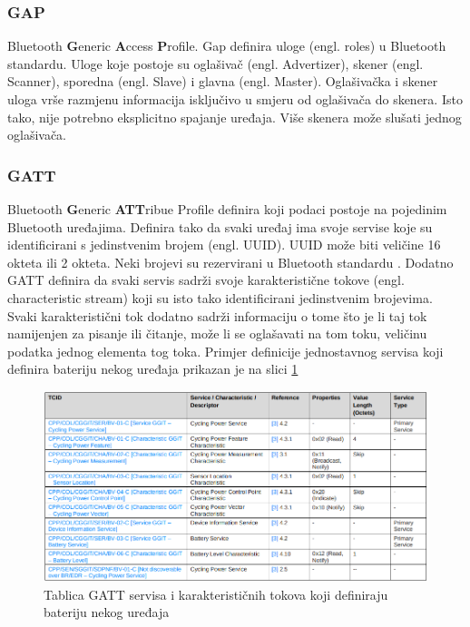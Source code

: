 \documentclass[times, utf8, diplomski]{diplomski}
\begin{document}
\subsubsection{GAP}
Bluetooth \textbf{G}eneric \textbf{A}ccess \textbf{P}rofile.
Gap definira uloge (engl. roles) u Bluetooth standardu. Uloge koje postoje su oglašivač (engl. Advertizer), skener (engl. Scanner), sporedna (engl. Slave) i glavna (engl. Master). Oglašivačka i skener uloga vrše razmjenu informacija isključivo u smjeru od oglašivača do skenera. Isto tako, nije potrebno eksplicitno spajanje uređaja.
Više skenera može slušati jednog oglašivača.

\subsubsection{GATT}
Bluetooth \textbf{G}eneric \textbf{ATT}ribue Profile definira koji podaci postoje na pojedinim Bluetooth uređajima. Definira tako da svaki uređaj ima svoje servise koje su identificirani s jedinstvenim brojem (engl. UUID). UUID može biti veličine 16 okteta ili 2 okteta. Neki brojevi su rezervirani u Bluetooth standardu \cite{core41}.
Dodatno GATT definira da svaki servis sadrži svoje karakteristične tokove (engl. characteristic stream) koji su isto tako identificirani jedinstvenim brojevima. Svaki karakteristični tok dodatno sadrži informaciju o tome što je li taj tok namijenjen za pisanje ili čitanje, može li se oglašavati na tom toku, veličinu podatka jednog elementa tog toka. Primjer definicije jednostavnog servisa koji definira bateriju nekog uređaja prikazan je na slici \ref{fig:gattexample}

\begin{figure}[H]
\includegraphics[width=\textwidth]{examplegatt_20230623_212042.png}
\centering
\caption{Tablica GATT servisa i karakterističnih tokova koji definiraju bateriju nekog uređaja}
\label{fig:gattexample}
\end{figure}
\end{document}
